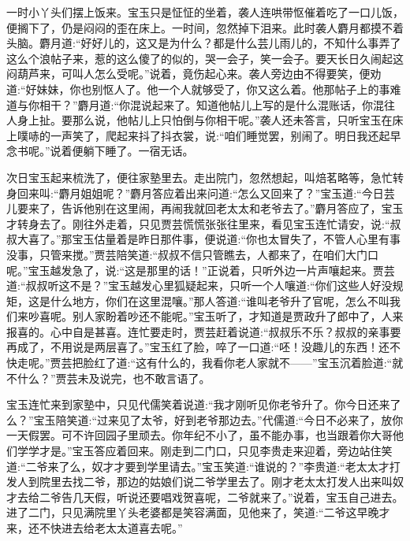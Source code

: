 \begin{parag}
    一时小丫头们摆上饭来。宝玉只是怔怔的坐着，袭人连哄带怄催着吃了一口儿饭，便搁下了，仍是闷闷的歪在床上。一时间，忽然掉下泪来。此时袭人麝月都摸不着头脑。麝月道:“好好儿的，这又是为什么？都是什么芸儿雨儿的，不知什么事弄了这么个浪帖子来，惹的这么傻了的似的，哭一会子，笑一会子。要天长日久闹起这闷葫芦来，可叫人怎么受呢。”说着，竟伤起心来。袭人旁边由不得要笑，便劝道:“好妹妹，你也别怄人了。他一个人就够受了，你又这么着。他那帖子上的事难道与你相干？”麝月道:“你混说起来了。知道他帖儿上写的是什么混账话，你混往人身上扯。要那么说，他帖儿上只怕倒与你相干呢。”袭人还未答言，只听宝玉在床上噗哧的一声笑了，爬起来抖了抖衣裳，说:“咱们睡觉罢，别闹了。明日我还起早念书呢。”说着便躺下睡了。一宿无话。
\end{parag}


\begin{parag}
    次日宝玉起来梳洗了，便往家塾里去。走出院门，忽然想起，叫焙茗略等，急忙转身回来叫:“麝月姐姐呢？”麝月答应着出来问道:“怎么又回来了？”宝玉道:“今日芸儿要来了，告诉他别在这里闹，再闹我就回老太太和老爷去了。”麝月答应了，宝玉才转身去了。刚往外走着，只见贾芸慌慌张张往里来，看见宝玉连忙请安，说:“叔叔大喜了。”那宝玉估量着是昨日那件事，便说道:“你也太冒失了，不管人心里有事没事，只管来搅。”贾芸陪笑道:“叔叔不信只管瞧去，人都来了，在咱们大门口呢。”宝玉越发急了，说:“这是那里的话！”正说着，只听外边一片声嚷起来。贾芸道:“叔叔听这不是？”宝玉越发心里狐疑起来，只听一个人嚷道:“你们这些人好没规矩，这是什么地方，你们在这里混嚷。”那人答道:“谁叫老爷升了官呢，怎么不叫我们来吵喜呢。别人家盼着吵还不能呢。”宝玉听了，才知道是贾政升了郎中了，人来报喜的。心中自是甚喜。连忙要走时，贾芸赶着说道:“叔叔乐不乐？叔叔的亲事要再成了，不用说是两层喜了。”宝玉红了脸，啐了一口道:“呸！没趣儿的东西！还不快走呢。”贾芸把脸红了道:“这有什么的，我看你老人家就不——”宝玉沉着脸道:“就不什么？”贾芸未及说完，也不敢言语了。
\end{parag}


\begin{parag}
    宝玉连忙来到家塾中，只见代儒笑着说道:“我才刚听见你老爷升了。你今日还来了么？”宝玉陪笑道:“过来见了太爷，好到老爷那边去。”代儒道:“今日不必来了，放你一天假罢。可不许回园子里顽去。你年纪不小了，虽不能办事，也当跟着你大哥他们学学才是。”宝玉答应着回来。刚走到二门口，只见李贵走来迎着，旁边站住笑道:“二爷来了么，奴才才要到学里请去。”宝玉笑道:“谁说的？”李贵道:“老太太才打发人到院里去找二爷，那边的姑娘们说二爷学里去了。刚才老太太打发人出来叫奴才去给二爷告几天假，听说还要唱戏贺喜呢，二爷就来了。”说着，宝玉自己进去。进了二门，只见满院里丫头老婆都是笑容满面，见他来了，笑道:“二爷这早晚才来，还不快进去给老太太道喜去呢。”
\end{parag}


